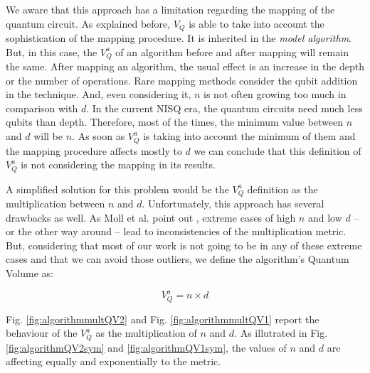 \begin{itemize}
\begin{itemize}
\begin{itemize}
\begin{minipage}{.45\textwidth}
\label{fig:algorithmQV1asym}

\end{minipage}%


We aware that this approach has a limitation regarding the mapping of the quantum circuit.
As explained before, \(V_Q\) is able to take into account the sophistication of the mapping procedure.
It is inherited in the \emph{model algorithm}.
But, in this case, the \(V^a_Q\) of an algorithm before and after mapping will remain the same.
After mapping an algorithm, the usual effect is an increase in the depth or the number of operations.
Rare mapping methods consider the qubit addition in the technique.
And, even considering it, \(n\) is not often growing too much in comparison with \(d\).
In the current NISQ era, the quantum circuits need much less qubits than depth.
Therefore, most of the times, the minimum value between \(n\) and \(d\) will be \(n\).
As soon as \(V^a_Q\) is taking into account the minimum of them and the mapping procedure affects mostly to \(d\) we can conclude that this definition of \(V^a_Q\) is not considering the mapping in its results.

A simplified solution for this problem would be the \(V^a_Q\) definition as the multiplication between \(n\) and \(d\).
Unfortunately, this approach has several drawbacks as well.
As Moll et al. point out \cite{Moll_2018}, extreme cases of high \(n\) and low \(d\) -- or the other way around -- lead to inconsistencies of the multiplication metric.
But, considering that most of our work is not going to be in any of these extreme cases and that we can avoid those outliers, we define the algorithm's Quantum Volume as:

$$V_Q^a =  n \times d$$

Fig. \ref{fig:algorithmmultQV2} and Fig. \ref{fig:algorithmmultQV1} report the behaviour of the \(V_Q^a\) as
the multiplication of \(n\) and \(d\).
As illutrated in Fig. \ref{fig:algorithmQV2sym} and \ref{fig:algorithmQV1sym}, the values of \(n\) and \(d\) are
affecting equally and exponentially to the metric.


\begin{minipage}{.45\textwidth}

\centering


\end{minipage}
\end{itemize}
\end{itemize}
\end{itemize}
